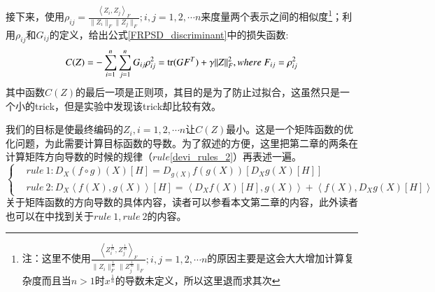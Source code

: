 接下来，使用$\rho_{ij}=\frac{\left<Z_{i},Z_{j}\right>_{F}}{\|Z_{i}\|_{F}\|Z_{j}\|_{F}};i,j=1,2,\cdots n$来度量两个表示之间的相似度\footnote{注：这里不使用$\frac{\left<Z_{i}^{\frac{1}{m}},Z_{j}^{\frac{1}{m}}\right>_{F}}{\|Z_{i}\|_{F}^{\frac{1}{m}}\|Z_{j}^{\frac{1}{m}}\|_{F}};i,j=1,2,\cdots n$的原因主要是这会大大增加计算复杂度而且当$n>1$时$x^{\frac{1}{n}}$的导数未定义，所以这里退而求其次}；利用$\rho_{ij}$和$G_{ij}$的定义，给出公式\ref{FRPSD_discriminant}中的损失函数:
\begin{equation}
\label{FRPSD_discriminant}
C(Z)=-\sum_{i=1}^{n}\sum_{j=1}^{n}G_{ij}\rho_{ij}^{2}={\rm tr}(GF^{T})+\gamma\|Z\|_{F}^{2},where~F_{ij}=\rho_{ij}^{2}
\end{equation}
其中函数$C(Z)$的最后一项是正则项，其目的是为了防止过拟合，这虽然只是一个小的trick，但是实验中发现该trick却比较有效。

我们的目标是使最终编码的$Z_{i}, i=1,2,\cdots n$让$C(Z)$最小。这是一个矩阵函数的优化问题，为此需要计算目标函数的导数。为了叙述的方便，这里把第二章的两条在计算矩阵方向导数的时候的规律（$rule$\ref{devi_rules_2}）再表述一遍。
\begin{displaymath}
\label{devi_rules}
\left\{
\begin{split}
&rule~1:D_{X}(f\circ g)(X)[H]=D_{g(X)}f(g(X))[D_{X}g(X)[H]]\\
&rule~2:D_{X}\left<f(X),g(X)\right>[H]=\left<D_{X}f(X)[H],g(X)\right>+\left<f(X),D_{X}g(X)[H]\right>
\end{split}
\right.
\end{displaymath}
关于矩阵函数的方向导数的具体内容，读者可以参看本文第二章的内容，此外读者也可以在\cite{Maniopt_DiscreteCurveFitting}中找到关于$rule~1,rule~2$的内容。

